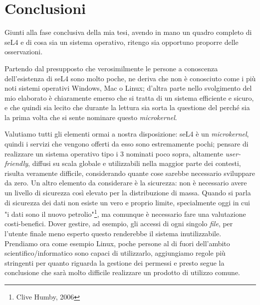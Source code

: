 \chapter{Conclusioni}
Giunti alla fase conclusiva della mia tesi, avendo in mano un quadro completo di seL4 e di cosa sia un sistema operativo, ritengo sia opportuno proporre delle osservazioni.

Partendo dal presupposto che verosimilmente le persone a conoscenza dell'esistenza di seL4 sono molto poche, ne deriva che non è conosciuto come i più noti sistemi operativi Windows, Mac o Linux; d'altra parte nello svolgimento del mio elaborato è chiaramente emerso che si tratta di un sistema efficiente e sicuro, e che quindi sia lecito che durante la lettura sia sorta la questione del perché sia la prima volta che si sente nominare questo \textit{microkernel}.

Valutiamo tutti gli elementi ormai a nostra disposizione: seL4 è un \textit{microkernel}, quindi i servizi che vengono offerti da esso sono estremamente pochi; pensare di realizzare un sistema operativo tipo i 3 nominati poco sopra, altamente \textit{user-friendly}, diffusi su scala globale e utilizzabili nella maggior parte dei contesti, risulta veramente difficile, considerando quante cose sarebbe necessario sviluppare da zero. Un altro elemento da considerare è la sicurezza: non è necessario avere un livello di sicurezza così elevato per la distribuzione di massa. Quando si parla di sicurezza dei dati non esiste un vero e proprio limite, specialmente oggi in cui "i dati sono il nuovo petrolio"\footnote{Clive Humby, 2006}, ma comunque è necessario fare una valutazione costi-benefici. Dover gestire, ad esempio, gli accessi di ogni singolo \textit{file}, per l'utente finale meno esperto questo renderebbe il sistema inutilizzabile. Prendiamo ora come esempio Linux, poche persone al di fuori dell'ambito scientifico/informatico sono capaci di utilizzarlo, aggiungiamo regole più stringenti per quanto riguarda la gestione dei permessi e presto segue la conclusione che sarà molto difficile realizzare un prodotto di utilizzo comune.

